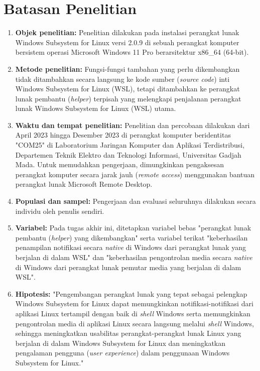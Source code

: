 \section{Batasan Penelitian}

\begin{enumerate}
    \item \textbf{Objek penelitian:} Penelitian dilakukan pada instalasi perangkat lunak Windows Subsystem for Linux versi 2.0.9 di sebuah perangkat komputer bersistem operasi Microsoft Windows 11 Pro berarsitektur x86\_64 (64-bit).
    
    \item \textbf{Metode penelitian:} Fungsi-fungsi tambahan yang perlu dikembangkan tidak ditambahkan secara langsung ke kode sumber (\textit{source code}) inti Windows Subsystem for Linux (WSL), tetapi ditambahkan ke perangkat lunak pembantu (\textit{helper}) terpisah yang melengkapi penjalanan perangkat lunak Windows Subsystem for Linux (WSL) utama.
    
    \item \textbf{Waktu dan tempat penelitian:} Penelitian dan percobaan dilakukan dari April 2023 hingga Desember 2023 di perangkat komputer beridentitas "COM25" di Laboratorium Jaringan Komputer dan Aplikasi Terdistribusi, Departemen Teknik Elektro dan Teknologi Informasi, Universitas Gadjah Mada. Untuk memudahkan pengerjaan, dimungkinkan pengaksesan perangkat komputer secara jarak jauh (\textit{remote access}) menggunakan bantuan perangkat lunak Microsoft Remote Desktop.
    
    \item \textbf{Populasi dan sampel:} Pengerjaan dan evaluasi seluruhnya dilakukan secara individu oleh penulis sendiri.
    
    \item \textbf{Variabel:} Pada tugas akhir ini, ditetapkan variabel bebas "perangkat lunak pembantu (\textit{helper}) yang dikembangkan" serta variabel terikat "keberhasilan penampilan notifikasi secara \textit{native} di Windows dari perangkat lunak yang berjalan di dalam WSL" dan "keberhasilan pengontrolan media secara \textit{native} di Windows dari perangkat lunak pemutar media yang berjalan di dalam WSL".
    
    \item \textbf{Hipotesis:} "Pengembangan perangkat lunak yang tepat sebagai pelengkap Windows Subsystem for Linux dapat memungkinkan notifikasi-notifikasi dari aplikasi Linux tertampil dengan baik di \textit{shell} Windows serta memungkinkan pengontrolan media di aplikasi Linux secara langsung melalui \textit{shell} Windows, sehingga meningkatkan usabilitas perangkat-perangkat lunak Linux yang berjalan di dalam Windows Subsystem for Linux dan meningkatkan pengalaman pengguna (\textit{user experience}) dalam penggunaan Windows Subsystem for Linux."
        

\end{enumerate}
